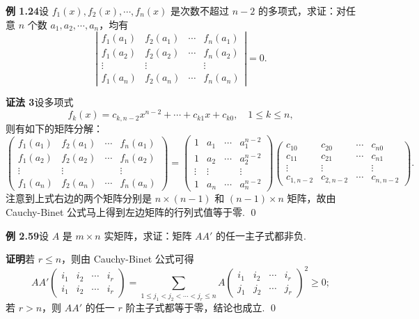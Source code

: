 \documentclass[UTF8,12pt,a4paper,fontset=fandol]{ctexart}
\begin{document}
\noindent\textbf{例 1.24}\quad 设 $f_1(x),f_2(x),\cdots,f_n(x)$ 是次数不超过 $n-2$ 的多项式，求证：对任意 $n$ 个数 $a_1,a_2,\cdots,a_n$，均有
\[
\left|
\begin{array}{cccc}
f_1(a_1) & f_2(a_1) & \cdots & f_n(a_1)\\
f_1(a_2) & f_2(a_2) & \cdots & f_n(a_2)\\
\vdots & \vdots & & \vdots\\
f_1(a_n) & f_2(a_n) & \cdots & f_n(a_n)
\end{array}
\right|=0.
\]

\noindent\textbf{证法 3}\quad 设多项式
\[
f_k(x)=c_{k,n-2}x^{n-2}+\cdots+c_{k1}x+c_{k0},\quad 1\le k\le n,
\]
则有如下的矩阵分解：
\[
\left(
\begin{array}{cccc}
f_1(a_1) & f_2(a_1) & \cdots & f_n(a_1)\\
f_1(a_2) & f_2(a_2) & \cdots & f_n(a_2)\\
\vdots & \vdots & & \vdots\\
f_1(a_n) & f_2(a_n) & \cdots & f_n(a_n)
\end{array}
\right)
=
\left(
\begin{array}{cccc}
1 & a_1 & \cdots & a_1^{n-2}\\
1 & a_2 & \cdots & a_2^{n-2}\\
\vdots & \vdots & & \vdots\\
1 & a_n & \cdots & a_n^{n-2}
\end{array}
\right)
\left(
\begin{array}{cccc}
c_{10} & c_{20} & \cdots & c_{n0}\\
c_{11} & c_{21} & \cdots & c_{n1}\\
\vdots & \vdots & & \vdots\\
c_{1,n-2} & c_{2,n-2} & \cdots & c_{n,n-2}
\end{array}
\right).
\]
注意到上式右边的两个矩阵分别是 $n\times(n-1)$ 和 $(n-1)\times n$ 矩阵，故由 Cauchy-Binet 公式马上得到左边矩阵的行列式值等于零. \qed

\noindent\textbf{例 2.59}\quad 设 $A$ 是 $m\times n$ 实矩阵，求证：矩阵 $AA'$ 的任一主子式都非负.

\noindent\textbf{证明}\quad 若 $r\le n$，则由 Cauchy-Binet 公式可得
\[
AA'\left(
\begin{array}{cccc}
i_1 & i_2 & \cdots & i_r\\
i_1 & i_2 & \cdots & i_r
\end{array}
\right)
=
\sum_{1\le j_1<j_2<\cdots<j_r\le n}
A\left(
\begin{array}{cccc}
i_1 & i_2 & \cdots & i_r\\
j_1 & j_2 & \cdots & j_r
\end{array}
\right)^2
\ge0;
\]
若 $r>n$，则 $AA'$ 的任一 $r$ 阶主子式都等于零，结论也成立. \qed
\end{document}
